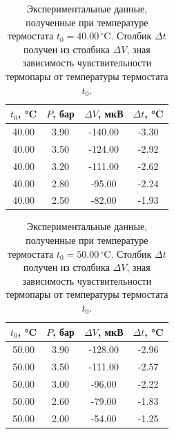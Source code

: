 \begin{table}[h]
\centering
\begin{tabular}{|c|c|c|c|}
\hline
$t_0$, °C & $P$, бар & $\Delta V$, мкВ & $\Delta t$, °C \\ \hline
40.00 & 3.90 & -140.00 & -3.30 \\ \hline
40.00 & 3.50 & -124.00 & -2.92 \\ \hline
40.00 & 3.20 & -111.00 & -2.62 \\ \hline
40.00 & 2.80 & -95.00 & -2.24 \\ \hline
40.00 & 2.50 & -82.00 & -1.93 \\ \hline
\end{tabular}
\caption{Экспериментальные данные, полученные при температуре термостата $t_0 = 40.00\,^\circ\text{C}$. Столбик $\Delta t$ получен из столбика $\Delta V$, зная зависимость чувствительности термопары от температуры термостата $t_0$.}
\end{table}

\begin{table}[h]
\centering
\begin{tabular}{|c|c|c|c|}
\hline
$t_0$, °C & $P$, бар & $\Delta V$, мкВ & $\Delta t$, °C \\ \hline
50.00 & 3.90 & -128.00 & -2.96 \\ \hline
50.00 & 3.50 & -111.00 & -2.57 \\ \hline
50.00 & 3.00 & -96.00 & -2.22 \\ \hline
50.00 & 2.60 & -79.00 & -1.83 \\ \hline
50.00 & 2.00 & -54.00 & -1.25 \\ \hline
\end{tabular}
\caption{Экспериментальные данные, полученные при температуре термостата $t_0 = 50.00\,^\circ\text{C}$. Столбик $\Delta t$ получен из столбика $\Delta V$, зная зависимость чувствительности термопары от температуры термостата $t_0$.}
\end{table}
